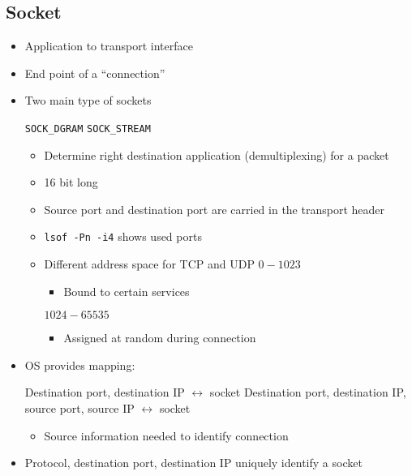 \subsection{Socket}
\begin{itemize}
    \item Application to transport interface
    \item End point of a ``connection''
    \item Two main type of sockets
        \begin{itemize}
             \verb+SOCK_DGRAM+
             \verb+SOCK_STREAM+
        \end{itemize}
        \begin{itemize}
            \item Determine right destination application (demultiplexing) for a packet
            \item 16 bit long
            \item Source port and destination port are carried in the transport header
            \item \verb+lsof -Pn -i4+ shows used ports
            \item Different address space for TCP and UDP
             $0 - 1023$
                \begin{itemize}
                    \item Bound to certain services
                \end{itemize}
             $1024 - 65535$
                \begin{itemize}
                    \item Assigned at random during connection
                \end{itemize}
        \end{itemize}
    \item OS provides mapping:
        \begin{itemize}
             Destination port, destination IP $\leftrightarrow$ socket
             Destination port, destination IP, source port, source IP $\leftrightarrow$ socket
                \begin{itemize}
                    \item Source information needed to identify connection
                \end{itemize}
        \end{itemize}
    \item Protocol, destination port, destination IP uniquely identify a socket
\end{itemize}
